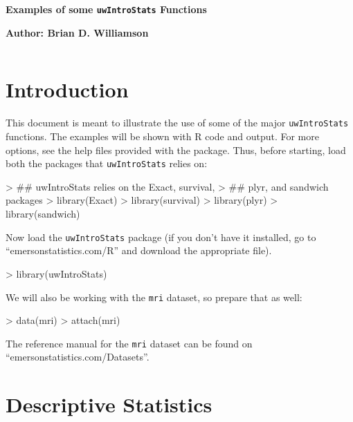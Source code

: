 \documentclass{article}
\begin{document}


\centerline{\large{\textbf{Examples of some \texttt{uwIntroStats} Functions}}}
\centerline{\textbf{Author: Brian D. Williamson}}
\tableofcontents
$$$$
\section{Introduction}
This document is meant to illustrate the use of some of the major \texttt{uwIntroStats} functions. The examples will be shown with R code and output. For more options, see the help files provided with the package. Thus, before starting, load both the packages that \texttt{uwIntroStats} relies on:
\begin{Schunk}
\begin{Sinput}
> ## uwIntroStats relies on the Exact, survival, 
> ## plyr, and sandwich packages
> library(Exact)
> library(survival)
> library(plyr)
> library(sandwich)
\end{Sinput}
\end{Schunk}
Now load the \texttt{uwIntroStats} package (if you don't have it installed, go to ``emersonstatistics.com/R'' and download the appropriate file).
\begin{Schunk}
\begin{Sinput}
> library(uwIntroStats)
\end{Sinput}
\end{Schunk}
We will also be working with the \texttt{mri} dataset, so prepare that as well:
\begin{Schunk}
\begin{Sinput}
> data(mri)
> attach(mri)
\end{Sinput}
\end{Schunk}
The reference manual for the \texttt{mri} dataset can be found on ``emersonstatistics.com/Datasets''. 

\section{Descriptive Statistics}
\end{document}
